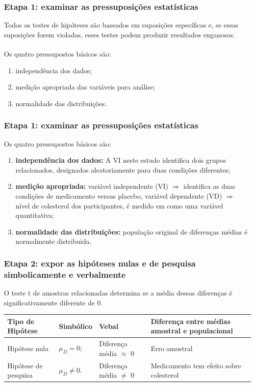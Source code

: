 \documentclass[11pt]{beamer}
\begin{document}
\begin{frame}
\frametitle{Etapa 1: examinar as pressuposições estatísticas}

Todos os testes de hipóteses são baseados em suposições específicas e, se essas suposições forem violadas, esses testes podem produzir resultados enganosos.\\~\\
Os quatro pressupostos básicos são:

\begin{enumerate}
\item independência dos dados;
\item medição apropriada das variáveis para análise;
\item normalidade das distribuições.
\end{enumerate}

\end{frame}

\begin{frame}
\frametitle{Etapa 1: examinar as pressuposições estatísticas}

Os quatro pressupostos básicos são:

\begin{enumerate}
\item \textbf{independência dos dados:} A VI neste estudo identifica dois grupos relacionados, designados aleatoriamente para duas condições diferentes;
\item \textbf{medição apropriada:} variável independente (VI) \(\Rightarrow\) identifica as duas condições de medicamento versus placebo, variável dependente (VD) \(\Rightarrow\) nível de colesterol dos participantes, é medido em como uma variável quantitativa;
\item \textbf{normalidade das distribuições:} população original de diferenças médias é normalmente distribuida.
\end{enumerate}

\end{frame}

\begin{frame}
\frametitle{Etapa 2: expor as hipóteses nulas e de pesquisa simbolicamente e verbalmente}

O teste t de amostras relacionadas determina se a média dessas diferenças é significativamente diferente de 0.

\begin{center}
\begin{tabular}{ m{2cm}|m{2cm}|m{3cm}|m{3cm} } 
 \hline
 Tipo de Hipótese & Simbólico & Vebal & Diferença entre médias amostral e populacional\\
  \hline
 Hipótese nula & $\mu_{D}=0;$ & Diferença média $\approx$ 0 & Erro amostral \\ 
 Hipótese de pesquisa & $\mu_{D} \neq 0.$ & Diferença média $\neq$ 0 & Medicamento tem efeito sobre colesterol  \\ 
 \hline
 \hline
\end{tabular}
\end{center}

\end{frame}
\end{document}
